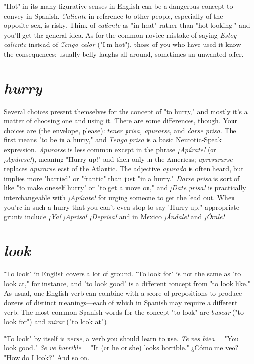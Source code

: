 "Hot" in its many figurative senses in English can be a dangerous concept to convey in Spanish. \emph{Caliente} in reference to other
people, especially of the opposite sex, is risky. Think of \emph{caliente} as
"in heat" rather than "hot-looking," and you'll get the general idea. As
for the common novice mistake of saying \emph{Estoy caliente} instead of
\emph{Tengo calor} ("I'm hot"), those of you who have used it know the consequences: usually belly laughs all around, sometimes an unwanted offer.

\section{\emph{hurry}}

Several choices present themselves for the concept of "to
hurry," and mostly it's a matter of choosing one and using it. There are
some differences, though. Your choices are (the envelope, please): \emph{tener
prisa, apurarse}, and \emph{darse prisa}. The first means "to be in a hurry,"
and \emph{Tengo prisa} is a basic Neurotic-Speak expression. \emph{Apurarse} is less
common except in the phrase \emph{¡Apúrate!} (or \emph{¡Apúrese!}), meaning "Hurry
up!" and then only in the Americas; \emph{apresurarse} replaces \emph{apurarse} east
of the Atlantic. The adjective \emph{apurado} is often heard, but implies more
"harried" or "frantic" than just "in a hurry." \emph{Darse prisa} is sort of like
"to make oneself hurry" or "to get a move on," and \emph{¡Date prisa!} is
practically interchangeable with \emph{¡Apúrate!} for urging someone to get
the lead out. When you're in such a hurry that you can't even stop to
say "Hurry up," appropriate grunts include \emph{¡Ya! ¡Aprisa! ¡Deprisa!} and
in Mexico \emph{¡Ándale!} and \emph{¡Órale!}

\section{\emph{look}}

"To look" in English covers a lot of ground. "To look for" is
not the same as "to look at," for instance, and "to look good" is a different concept from "to look like." As usual, one English verb can
combine with a score of prepositions to produce dozens of distinct
meanings---each of which in Spanish may require a different verb. The
most common Spanish words for the concept "to look" are \emph{buscar} ("to
look for") and \emph{mirar} ("to look at").

"To look" by itself is \emph{verse}, a verb you should learn to use. \emph{Te
ves bien} = "You look good." \emph{Se ve horrible} = "It (or he or she) looks
horrible." ¿Cómo me veo? = "How do I look?" And so on.

